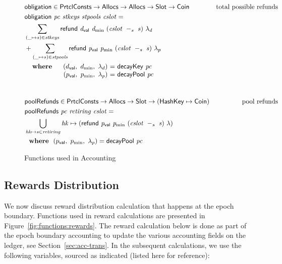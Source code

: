 \begin{figure}[htb]
  \begin{align*}
      & \fun{obligation} \in \PrtclConsts \to \Allocs \to \Allocs \to \Slot \to \Coin
      & \text{total possible refunds} \\
      & \obligation{pc}{stkeys}{stpools}{cslot} =\\
      & \sum\limits_{(\_ \mapsto s) \in \var{stkeys}}
        \refund{d_{\mathsf{val}}}{d_{\min}}{(\slotminus{cslot}{s})}{\lambda_d} \\
      & + \sum\limits_{(\_ \mapsto s) \in \var{stpools}}
        \refund{p_{\mathsf{val}}}{p_{\min}}{(\slotminus{cslot}{s})}{\lambda_p} \\
      &
      \begin{array}{lr@{~=~}l}
        \where
          & (\dval,~d_{\min},~\lambda_d) & \fun{decayKey}~\var{pc}\\
          & (p_{\mathsf{val}},~p_{\min},~\lambda_p) & \fun{decayPool}~\var{pc}\\
      \end{array}\\
      \nextdef
      & \fun{poolRefunds} \in \PrtclConsts \to \Allocs \to \Slot \to (\HashKey \mapsto \Coin)
      & \text{pool refunds} \\
      & \poolRefunds{pc}{retiring}{cslot} = \\
      & \bigcup_{\var{hk}\mapsto s\in\var{retiring}}
          \var{hk}\mapsto( \refund{p_{\mathsf{val}}}{p_{\min}}{(\slotminus{cslot}{s})}{\lambda} ) \\
      &
        \where (p_{\mathsf{val}},~p_{\min},~\lambda_p) = \fun{decayPool}~\var{pc}\\
  \end{align*}
  \caption{Functions used in Accounting}
  \label{fig:functions:epoch}
\end{figure}

\subsection{Rewards Distribution}
\label{sec:reward-dist}

We now discuss reward distribution calculation that happens at the epoch boundary.
Functions used in reward calculations are presented in
Figure~\ref{fig:functions:rewards}. The reward calculation below is done as part of the
epoch boundary accounting to update the various accounting fields on the ledger,
see Section~\ref{sec:acc-trans}. In the subsequent calculations, we use the
following variables, sourced as indicated (listed here for reference):

